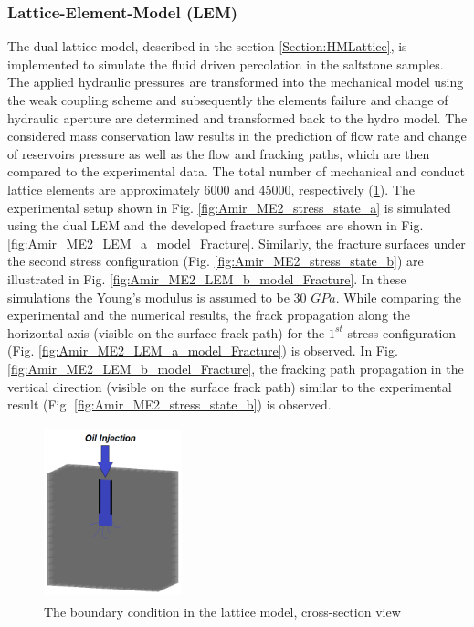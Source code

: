 \subsubsection*{Lattice-Element-Model (LEM)}

The dual lattice model, described in the section \ref{Section:HMLattice}, is implemented to simulate the fluid driven percolation in the saltstone samples. The applied hydraulic pressures are transformed into the mechanical model using the weak coupling scheme and subsequently the elements failure and change of hydraulic aperture are determined and transformed back to the hydro model. The considered mass conservation law results in the prediction of flow rate and change of reservoirs pressure as well as the flow and fracking paths, which are then compared to the experimental data. The total number of mechanical and conduct lattice elements are approximately 6000 and 45000, respectively (\ref{fig:Amir_ME2_LEM_a_model}).  The experimental setup shown in Fig. \ref{fig:Amir_ME2_stress_state_a} is simulated using the dual LEM and the developed fracture surfaces are shown in Fig. \ref{fig:Amir_ME2_LEM_a_model_Fracture}. Similarly, the fracture surfaces under the second stress configuration (Fig. \ref{fig:Amir_ME2_stress_state_b}) are illustrated in Fig. \ref{fig:Amir_ME2_LEM_b_model_Fracture}. In these simulations the Young's modulus is assumed to be 30 $GPa$. While comparing the experimental and the numerical results, the frack propagation along the horizontal axis (visible on the surface frack path) for the $1^{st}$ stress configuration (Fig. \ref{fig:Amir_ME2_LEM_a_model_Fracture}) is observed. In Fig. \ref{fig:Amir_ME2_LEM_b_model_Fracture}, the fracking path propagation in the vertical direction (visible on the surface frack path) similar to the experimental result (Fig. \ref{fig:Amir_ME2_stress_state_b}) is observed.  

\begin{figure}[!ht]
\centering
\includegraphics[width=4cm,height=5cm]{figures/Amir_ME2_LEM_a_model.png}
\caption{The boundary condition in the lattice model, cross-section view}
\label{fig:Amir_ME2_LEM_a_model}
\end{figure}

